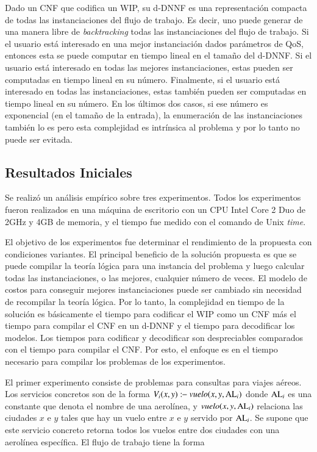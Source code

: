 Dado un CNF que codifica un WIP, su d-DNNF es una representación compacta de
todas las instanciaciones del flujo de trabajo. Es decir, uno puede generar de
una manera libre de \emph{backtracking} todas las instanciaciones del flujo de
trabajo. Si el usuario está interesado en una mejor instanciación dados
parámetros de QoS, entonces esta se puede computar en tiempo lineal en el tamaño
del d-DNNF. Si el usuario está interesado en todas las mejores instanciaciones,
estas pueden ser computadas en tiempo lineal en su número. Finalmente, si el
usuario está interesado en todas las instanciaciones, estas también pueden ser
computadas en tiempo lineal en su número. En los últimos dos casos, si ese
número es exponencial (en el tamaño de la entrada), la enumeración de las
instanciaciones también lo es pero esta complejidad es intrínsica al problema y
por lo tanto no puede ser evitada.

\subsection{Resultados Iniciales}

Se realizó un análisis empírico sobre tres experimentos. Todos los experimentos
fueron realizados en una máquina de escritorio con un CPU Intel Core 2 Duo de
2GHz y 4GB de memoria, y el tiempo fue medido con el comando de Unix
\emph{time}.

El objetivo de los experimentos fue determinar el rendimiento de la propuesta con
condiciones variantes. El principal beneficio de la solución propuesta es
que se puede compilar la teoría lógica para una instancia del problema y luego
calcular todas las instanciaciones, o las mejores, cualquier número de veces. El
modelo de costos para conseguir mejores instanciaciones puede ser cambiado sin
necesidad de recompilar la teoría lógica. Por lo tanto, la complejidad en tiempo
de la solución es básicamente el tiempo para codificar el WIP como un
CNF más el tiempo para compilar el CNF en un d-DNNF y el tiempo para decodificar
los modelos. Los tiempos para codificar y decodificar son despreciables
comparados con el tiempo para compilar el CNF. Por esto, el enfoque es en el tiempo
necesario para compilar los problemas de los experimentos.

El primer experimento consiste de problemas para consultas para viajes aéreos.
Los servicios concretos son de la forma $V_i(x,y):\!\!-\ \text{\it vuelo}(x,y,\text{AL}_i)$
donde $\text{AL}_i$ es una
constante que denota el nombre de una aerolínea, y $\text{\it vuelo}(x,y,\text{AL}_i)$ relaciona las
ciudades $x$ e $y$ tales que hay un vuelo entre $x$ e $y$ servido por $\text{AL}_i$.
Se supone que este servicio concreto retorna todos los vuelos entre dos ciudades
con una aerolínea específica. El flujo de trabajo tiene la forma

